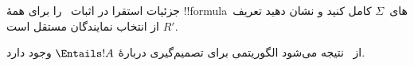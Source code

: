 \documentclass[../../../include/open-logic-section]{subfiles}
\begin{document}
\begin{prob}
جزئیات استقرا در اثبات~ را برای
همهٔ !!{formula}های~$\Sigma$ کامل کنید و نشان دهید تعریف~$R'$ از انتخاب
نمایندگان مستقل است.
\end{prob}

از~ نتیجه می‌شود الگوریتمی برای تصمیم‌گیری دربارهٔ
$\Entails !A$ وجود دارد.
\end{document}
